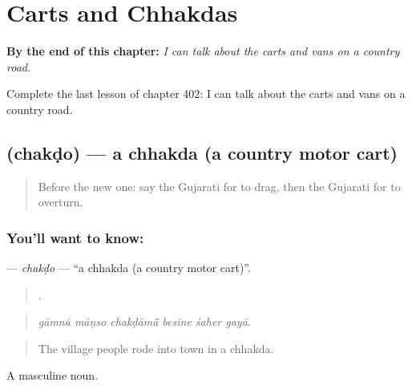 
\chapter{Carts and Chhakdas}
\label{ch:gu-carts-and-chhakdas}

\begin{chapteropening}
\textbf{By the end of this chapter:} \emph{I can talk about the carts and vans on a country road.}

Complete the last lesson of chapter 402: I can talk about the carts and vans on a country road.
\end{chapteropening}

\section[\texorpdfstring{\gu{છકડો} (chakḍo)}{છકડો (chakḍo)}]{ (chakḍo) — a chhakda (a country motor cart)}

\label{lesson:GU-C402-chakdo}



\begin{quote}
Before the new one: say the Gujarati for to drag, then the Gujarati for to overturn.
\end{quote}

\subsection*{You'll want to know: }
\textbf{} — \emph{chakḍo} — \textquotedblleft{}a chhakda (a country motor cart)\textquotedblright{}.

\begin{quote}
     .
\end{quote}

\begin{quote}
\emph{gāmnā māṇso chakḍāmā̃ besīne śaher gayā.}
\end{quote}

\begin{quote}
The village people rode into town in a chhakda.
\end{quote}

A masculine noun.

